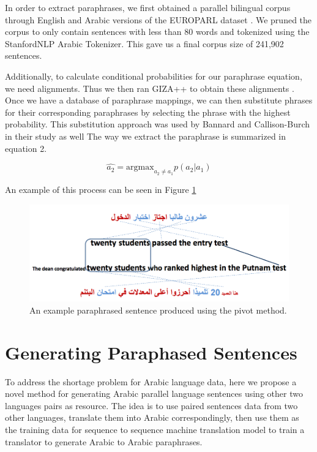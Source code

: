 \documentclass[11pt,letterpaper]{article}
\begin{document}
In order to extract paraphrases, we first obtained a parallel bilingual corpus through English and Arabic versions of the EUROPARL dataset \cite{Koehn_europarl}. We pruned the corpus to only contain sentences with less than 80 words and tokenized using the StanfordNLP Arabic Tokenizer. This gave us a final corpus size of 241,902 sentences. 

Additionally, to calculate conditional probabilities for our paraphrase equation, we need alignments. Thus we then ran GIZA++ to obtain these alignments \cite{och03:asc}. Once we have a database of paraphrase mappings, we can then substitute phrases for their corresponding paraphrases by selecting the phrase with the highest probability. This substitution approach was used by Bannard and Callison-Burch in their study as well \cite{bannard2005bilingual} The way we extract the paraphrase is summarized in equation 2. 

\begin{equation}
\hat{a_2} = \text{argmax}_{a_2 \neq a_1} p(a_2 | a_1)
\end{equation}

An example of this process can be seen in Figure \ref{fig:pivot}
\begin{figure}
\includegraphics[scale=0.25]{arabic_pivot}
\caption{An example paraphrased sentence produced using the pivot method. }
\label{fig:pivot}
\end{figure}
\section{Generating Paraphased Sentences}
	To address the shortage problem for Arabic language data, here we propose a novel method for generating Arabic parallel language sentences using other two languages pairs as resource. The idea is to use paired sentences data from two other languages, translate them into Arabic correspondingly, then use them as the  training data for sequence to sequence machine translation model to train a translator  to generate Arabic to Arabic paraphrases.
  
\end{document}
